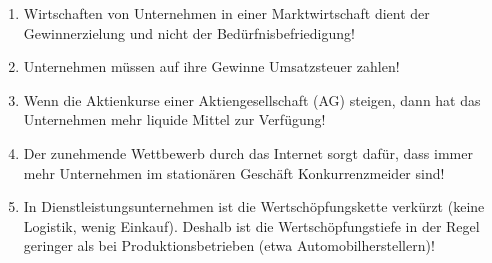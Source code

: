 \begin{enumerate}
    \item Wirtschaften von Unternehmen in einer Marktwirtschaft dient der Gewinnerzielung und nicht der Bedürfnisbefriedigung!
    \item Unternehmen müssen auf ihre Gewinne Umsatzsteuer zahlen!
    \item Wenn die Aktienkurse einer Aktiengesellschaft (AG) steigen, dann hat das Unternehmen mehr liquide Mittel zur Verfügung!
    \item Der zunehmende Wettbewerb durch das Internet sorgt dafür, dass immer mehr Unternehmen im stationären Geschäft Konkurrenzmeider sind!
    \item In Dienstleistungsunternehmen ist die Wertschöpfungskette verkürzt (keine Logistik, wenig Einkauf). Deshalb ist die Wertschöpfungstiefe in der Regel geringer als bei Produktionsbetrieben (etwa Automobilherstellern)!
\end{enumerate}

